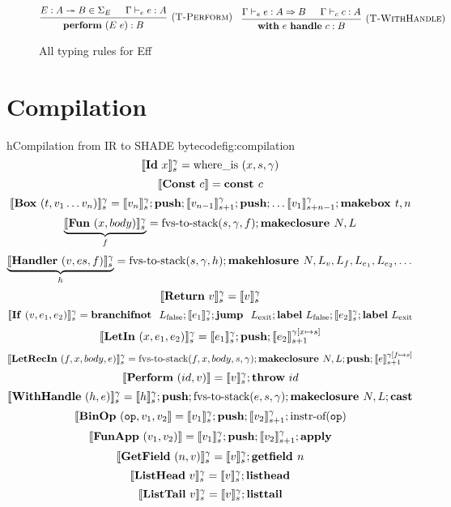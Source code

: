 \documentclass[class=article, crop=false]{standalone}
\begin{document}
\begin{figure}[H]
    $$
    \begin{prooftree}
      \hypo{E : A \tto B \in \Sigma_E}
      \hypo{\Gamma \vdash_e e : A}
      \infer2[(\textsc{T-Perform})]{\effPerform (E\ e) : B}
    \end{prooftree}
    \quad
    \begin{prooftree}
      \hypo{\Gamma \vdash_e e : A \handlerType B}
      \hypo{\Gamma \vdash_c c : A}
      \infer2[(\textsc{T-WithHandle})]{\effWith e \effHandle c : B}
    \end{prooftree}
    $$
    
    \caption{All typing rules for Eff}
    \label{fig:full-type-checking}
  \end{figure}

\section{Compilation}

\begin{myfigure}[1]{h}{Compilation from IR to SHADE bytecode}{fig:compilation}
    $$ \interp{\irId\ x}_s^\gamma = \text{where\_is}\ (x, s, \gamma) $$
    $$ \interp{\irConst\ c} = \textbf{const } c $$
    $$ \llbracket \mathbf{Box}\ (t, v_1 \dots v_n) \rrbracket_s ^ \gamma = \llbracket v_n \rrbracket_s^\gamma; \textbf{push}; \llbracket v_{n-1} \rrbracket_{s+1}^\gamma; \textbf{push}; \dots \llbracket v_1 \rrbracket_{s+n-1}^\gamma; \textbf{makebox }t, n $$
    $$ \underbrace{\llbracket \mathbf{Fun}\ (x, body) \rrbracket_s ^\gamma }_f = \text{fvs-to-stack} (s, \gamma, f); \textbf{makeclosure }N, L $$
    $$ \underbrace{\llbracket \mathbf{Handler}\ (v, es, f) \rrbracket_s^\gamma}_h = \text{fvs-to-stack} (s, \gamma, h); \textbf{makehlosure }N, L_v, L_f, L_{e_1}, L_{e_2}, \dots $$
    $$ \llbracket \mathbf{Return}\ v \rrbracket_s ^ \gamma =  \llbracket v \rrbracket_s ^ \gamma $$
    $$ \llbracket \mathbf{If}\ (v, e_1, e_2) \rrbracket_s ^ \gamma = \textbf{branchifnot }\ L_\text{false}; \llbracket e_1 \rrbracket_s^\gamma; \textbf{jump }\ L_\text{exit}; \textbf{label}\ L_\text{false}; \llbracket e_2 \rrbracket_s^\gamma; \textbf{label}\ L_\text{exit} $$
    $$ \llbracket \mathbf{LetIn}\ (x, e_1, e_2) \rrbracket_s^\gamma = \llbracket e_1 \rrbracket_s^\gamma; \textbf{push}; \llbracket e_2 \rrbracket_{s+1}^{\gamma[x \mapsto s]} $$
    $$ \llbracket \mathbf{LetRecIn}\ (f, x, body, e) \rrbracket_s^\gamma = \text{fvs-to-stack}(f, x, body, s, \gamma); \textbf{makeclosure }N, L; \textbf{push}; \llbracket e \rrbracket_{s+1}^{\gamma[f \mapsto s]} $$
    $$ \llbracket \mathbf{Perform}\ (id, v) \rrbracket = \llbracket v \rrbracket_s ^ \gamma; \textbf{throw}\ id $$
    $$ \llbracket \mathbf{WithHandle}\ (h, e) \rrbracket_s ^ \gamma = \llbracket h \rrbracket_s ^ \gamma; \textbf{push}; \text{fvs-to-stack}(e, s, \gamma); \textbf{makeclosure }N, L; \mathbf{cast} $$
    $$ \llbracket \mathbf{BinOp}\ (\mathtt{op}, v_1, v_2 \rrbracket = \llbracket v_1 \rrbracket_s ^ \gamma; \textbf{push}; \llbracket v_2 \rrbracket_{s+1}^\gamma; \text{instr-of}(\mathtt{op}) $$
    $$ \llbracket \mathbf{FunApp}\ (v_1, v_2) \rrbracket = \llbracket v_1 \rrbracket_s ^ \gamma; \textbf{push}; \llbracket v_2 \rrbracket_{s+1} ^ \gamma; \textbf{apply} $$
    $$ \llbracket \mathbf{GetField}\ (n, v) \rrbracket_s ^ \gamma = \llbracket v \rrbracket_s ^ \gamma; \textbf{getfield }n $$
    $$ \llbracket \mathbf{ListHead}\ v \rrbracket_s ^ \gamma = \llbracket v \rrbracket_s ^ \gamma; \textbf{listhead} $$
    $$ \llbracket \mathbf{ListTail}\ v \rrbracket_s ^ \gamma = \llbracket v \rrbracket_s ^ \gamma ; \textbf{listtail} $$
\end{myfigure}
\end{document}
